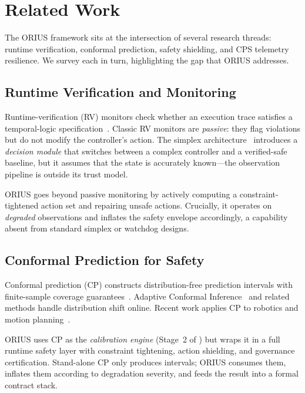\section{Related Work}\label{sec:related}

The ORIUS framework sits at the intersection of several research threads: runtime
verification, conformal prediction, safety shielding, and CPS telemetry resilience.
We survey each in turn, highlighting the gap that ORIUS addresses.

\subsection{Runtime Verification and Monitoring}

Runtime-verification (RV) monitors check whether an execution trace satisfies a
temporal-logic specification~\cite{leucker2009brief,bartocci2018introduction}.  Classic RV
monitors are \emph{passive}: they flag violations but do not modify the controller's
action.  The simplex architecture~\cite{sha2001using} introduces a \emph{decision
module} that switches between a complex controller and a verified-safe baseline, but
it assumes that the state is accurately known---the observation pipeline is outside
its trust model.

ORIUS goes beyond passive monitoring by actively computing a
constraint-tightened action set and repairing unsafe actions.  Crucially, it operates
on \emph{degraded} observations and inflates the safety envelope accordingly, a
capability absent from standard simplex or watchdog designs.

\subsection{Conformal Prediction for Safety}

Conformal prediction (CP) constructs distribution-free prediction intervals with
finite-sample coverage guarantees~\cite{vovk2005algorithmic}.  Adaptive Conformal
Inference~\cite{gibbs2021adaptive} and related methods handle distribution shift
online.  Recent work applies CP to robotics and motion
planning~\cite{lindemann2023conformal,dixit2023adaptive}.

ORIUS uses CP as the \emph{calibration engine} (Stage~2 of \dcs{}) but wraps it in a
full runtime safety layer with constraint tightening, action shielding, and governance
certification.  Stand-alone CP only produces intervals; ORIUS consumes them,
inflates them according to degradation severity, and feeds the result into a formal
contract stack.

